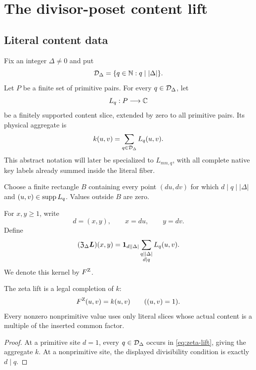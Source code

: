 \section{The divisor-poset content lift}
\label{sec:zeta-lift}

\subsection{Literal content data}

Fix an integer \(\Delta\ne0\) and put
\[
 \mathcal D_\Delta=\{q\in\mathbb N:q\mid|\Delta|\}.
\]
Let \(P\) be a finite set of primitive pairs.  For every
\(q\in\mathcal D_\Delta\), let
\[
 L_q:P\longrightarrow\mathbb C
\]
be a finitely supported content slice, extended by zero to all primitive
pairs.  Its physical aggregate is
\[
 k(u,v)=\sum_{q\in\mathcal D_\Delta}L_q(u,v).
\]
This abstract notation will later be specialized to
\(L_{mn,q}\), with all complete native key labels already summed inside
the literal fiber.

Choose a finite rectangle \(B\) containing every point
\((du,dv)\) for which \(d\mid q\mid|\Delta|\) and
\((u,v)\in\operatorname{supp} L_q\).  Values outside \(B\) are zero.

\begin{definition}
\label{def:content-zeta-lift}
For \(x,y\ge1\), write
\[
 d=(x,y),\qquad x=du,\qquad y=dv.
\]
Define
\begin{equation}
 (\mathfrak Z_\Delta\boldsymbol L)(x,y)
 =
 \mathbf 1_{d\mid|\Delta|}
 \sum_{\substack{q\mid|\Delta|\\d\mid q}}
 L_q(u,v).
 \label{eq:zeta-lift}
\end{equation}
We denote this kernel by \(F^{\rm Z}\).
\end{definition}

\begin{proposition}
\label{prop:zeta-legal}
The zeta lift is a legal completion of \(k\):
\[
 F^{\rm Z}(u,v)=k(u,v)\qquad((u,v)=1).
\]
Every nonzero nonprimitive value uses only literal slices whose actual
content is a multiple of the inserted common factor.
\end{proposition}

\begin{proof}
At a primitive site \(d=1\), every \(q\in\mathcal D_\Delta\) occurs in
\eqref{eq:zeta-lift}, giving the aggregate \(k\).  At a nonprimitive
site, the displayed divisibility condition is exactly \(d\mid q\).
\end{proof}

